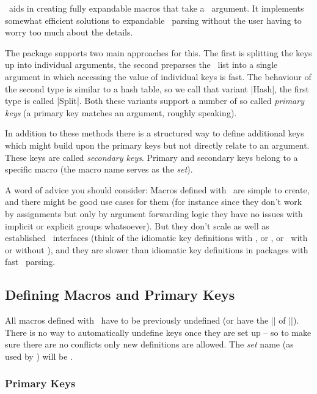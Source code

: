 \genericekv{}

\expkvc\ aids in creating fully expandable macros that take a \kv\ argument. It
implements somewhat efficient solutions to expandable \kv\ parsing without the
user having to worry too much about the details.

The package supports two main approaches for this. The first is splitting the
keys up into individual arguments, the second preparses the \kv\ list into a
single argument in which accessing the value of individual keys is fast. The
behaviour of the second type is similar to a hash table, so we call that variant
|Hash|, the first type is called |Split|. Both these variants support a number
of so called \emph{primary keys} (a primary key matches an argument, roughly
speaking).

In addition to these methods there is a structured way to define additional keys
which might build upon the primary keys but not directly relate to an argument.
These keys are called \emph{secondary keys}. Primary and secondary keys belong
to a specific macro (the macro name serves as the \emph{set}).

A word of advice you should consider: Macros defined with \expkvc\ are simple to
create, and there might be good use cases for them (for instance since they
don't work by assignments but only by argument forwarding logic they have no
issues with implicit or explicit groups whatsoever). But they don't scale as
well as established \kv\ interfaces (think of the idiomatic key definitions with
, or , or \expkv\ with or without \expkvd), and they are
slower than idiomatic key definitions in packages with fast \kv\ parsing.


\subsection{Defining Macros and Primary Keys}

All macros defined with \expkvc\ have to be previously undefined (or have the
|\meaning| of |\relax|). There is no way to automatically undefine keys once
they are set up -- so to make sure there are no conflicts only new definitions
are allowed. The \emph{set} name (as used by ) will be
.


\subsubsection{Primary Keys\label{sec:c:primary}}

